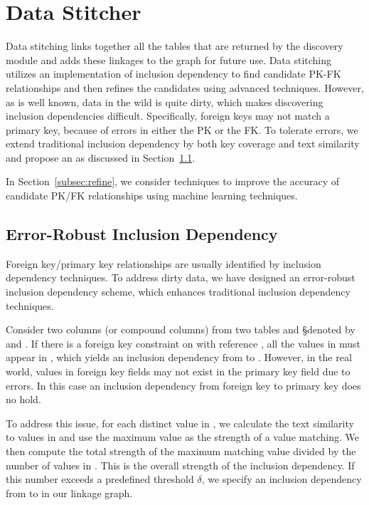 \section{Data Stitcher}
\label{sec:stitching}




Data stitching links together all the tables that are 
returned by the discovery module
and adds these linkages to the graph for future use. 
Data stitching utilizes an implementation of inclusion dependency to find candidate PK-FK relationships and then refines the candidates using advanced techniques. However, as is well known, data in the wild is quite dirty, which makes discovering inclusion dependencies difficult.  Specifically, foreign keys may not match a primary key, because of errors in either the PK or the FK. To tolerate errors, we extend traditional inclusion dependency by both key coverage and text similarity and propose an \emph{\eind} as discussed in Section~\ref{subsec:eind}.

In Section~\ref{subsec:refine}, we consider techniques to improve the accuracy of candidate PK/FK relationships using machine learning techniques.


\subsection{Error-Robust Inclusion Dependency}\label{subsec:eind}

Foreign key/primary key relationships are usually identified by inclusion dependency techniques. To address dirty data, we have designed an error-robust inclusion dependency scheme, which enhances traditional inclusion dependency techniques.

Consider two columns (or compound columns) from two tables \R and \S denoted by \RX and \SY. If there is a foreign key constraint on \RX with reference \SY, all the values in \RX must appear in \SY, which yields an inclusion dependency from \RX to \SY. However, in the real world, values in foreign key fields may not exist in the primary key field due to errors.  In this case an inclusion dependency from foreign key to primary key does no hold. 

To address this issue, for each distinct value in \RX, we calculate the text similarity to values in \SY and use the maximum value as the strength of a value matching. We then compute the total strength of the maximum matching value divided by the number of values in \RX. This is the overall strength of the inclusion dependency.  If this number exceeds a predefined threshold $\delta$, we specify an inclusion dependency from \RX to \SY in our linkage graph. 

